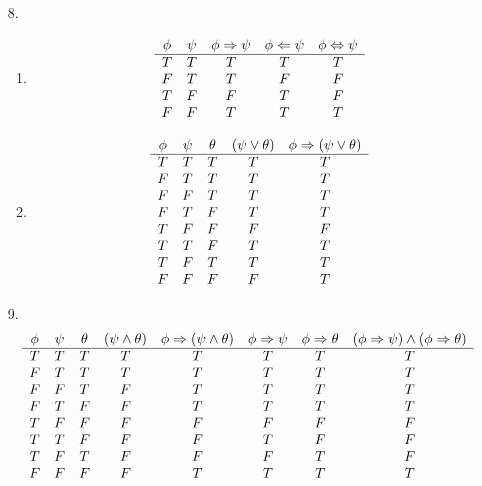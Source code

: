 \documentclass[11pt]{exam}
\begin{document}
\begin{enumerate}[leftmargin=0pt]
\item[8.]
\begin{enumerate}[label=(\alph*)]
    \item \begin{displaymath}
    \begin{array}{c c c c c}
         \phi & \psi & \phi \Rightarrow \psi & \phi \Leftarrow \psi & \phi \Leftrightarrow \psi \\
         \hline 
         T & T & T & T & T \\
         F & T & T & F & F \\
         T & F & F & T & F \\
         F & F & T & T & T
    \end{array}
\end{displaymath}

    \item \begin{displaymath}
    \begin{array}{c c c c c}
         \phi & \psi & \theta & (\psi \lor \theta)& \phi \Rightarrow (\psi \lor \theta) \\
         \hline 
         T & T & T & T & T \\
         F & T & T & T & T \\
         F & F & T & T & T \\
         F & T & F & T & T \\
         T & F & F & F & F \\
         T & T & F & T & T \\
         T & F & T & T & T \\
         F & F & F & F & T
    \end{array}
\end{displaymath}
\end{enumerate}

\item[9.]
\begin{displaymath}
    \begin{array}{c c c c c c c c}
         \phi & \psi & \theta & (\psi \land \theta) & \phi \Rightarrow (\psi \land \theta) & \phi \Rightarrow \psi & \phi \Rightarrow \theta & (\phi \Rightarrow \psi) \land (\phi \Rightarrow \theta)\\
         \hline 
         T & T & T & T & T & T & T & T\\
         F & T & T & T & T & T & T & T\\
         F & F & T & F & T & T & T & T\\
         F & T & F & F & T & T & T & T\\
         T & F & F & F & F & F & F & F\\
         T & T & F & F & F & T & F & F\\
         T & F & T & F & F & F & T & F\\
         F & F & F & F & T & T & T & T
    \end{array}
\end{displaymath}


\end{enumerate}
\end{document}
